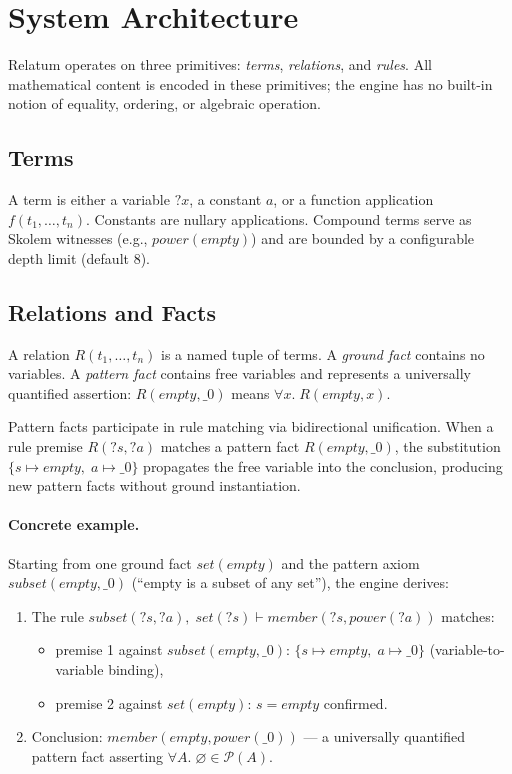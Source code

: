 \section{System Architecture}
\label{sec:system}

Relatum operates on three primitives: \emph{terms}, \emph{relations}, and \emph{rules}. All mathematical content is encoded in these primitives; the engine has no built-in notion of equality, ordering, or algebraic operation.

\subsection{Terms}

A term is either a variable $?x$, a constant $a$, or a function application $f(t_1, \ldots, t_n)$. Constants are nullary applications. Compound terms serve as Skolem witnesses (e.g., $\mathit{power}(\mathit{empty})$) and are bounded by a configurable depth limit (default 8).

\subsection{Relations and Facts}

A relation $R(t_1, \ldots, t_n)$ is a named tuple of terms. A \emph{ground fact} contains no variables. A \emph{pattern fact} contains free variables and represents a universally quantified assertion: $R(\mathit{empty}, \_0)$ means $\forall x.\; R(\mathit{empty}, x)$.

Pattern facts participate in rule matching via bidirectional unification. When a rule premise $R(?s, ?a)$ matches a pattern fact $R(\mathit{empty}, \_0)$, the substitution $\{s \mapsto \mathit{empty},\; a \mapsto \_0\}$ propagates the free variable into the conclusion, producing new pattern facts without ground instantiation.

\paragraph{Concrete example.} Starting from one ground fact $\mathit{set}(\mathit{empty})$ and the pattern axiom $\mathit{subset}(\mathit{empty}, \_0)$ (``empty is a subset of any set''), the engine derives:

\begin{enumerate}
\item The rule $\mathit{subset}(?s, ?a),\; \mathit{set}(?s) \vdash \mathit{member}(?s, \mathit{power}(?a))$ matches:
\begin{itemize}
\item premise 1 against $\mathit{subset}(\mathit{empty}, \_0)$: $\{s \mapsto \mathit{empty},\; a \mapsto \_0\}$ (variable-to-variable binding),
\item premise 2 against $\mathit{set}(\mathit{empty})$: $s = \mathit{empty}$ confirmed.
\end{itemize}
\item Conclusion: $\mathit{member}(\mathit{empty}, \mathit{power}(\_0))$ --- a universally quantified pattern fact asserting $\forall A.\; \varnothing \in \mathcal{P}(A)$.
\end{enumerate}


